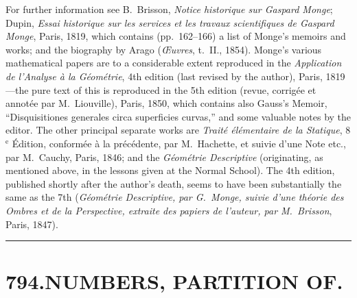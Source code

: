 \documentclass[11pt,a4paper]{article}
\begin{document}
For further information see B.\ Brisson, \textit{Notice historique sur Gaspard Monge}; Dupin, \textit{Essai historique sur les services et les travaux scientifiques de Gaspard Monge}, Paris, 1819, which contains (pp.~162--166) a list of Monge's memoirs and works; and the biography by Arago (\textit{\OE uvres}, t.~II., 1854). Monge's various mathematical papers are to a considerable extent reproduced in the \textit{Application de l'Analyse \`a la G\'eom\'etrie}, 4th edition (last revised by the author), Paris, 1819---the pure text of this is reproduced in the 5th edition (revue, corrig\'ee et annot\'ee par M.\ Liouville), Paris, 1850, which contains also Gauss's Memoir, ``Disquisitiones generales circa superficies curvas,'' and some valuable notes by the editor. The other principal separate works are \textit{Trait\'e \'el\'ementaire de la Statique}, 8$^{\text{e}}$ \'Edition, conform\'ee \`a la pr\'ec\'edente, par M.\ Hachette, et suivie d'une Note etc., par M.\ Cauchy, Paris, 1846; and the \textit{G\'eom\'etrie Descriptive} (originating, as mentioned above, in the lessons given at the Normal School). The 4th edition, published shortly after the author's death, seems to have been substantially the same as the 7th (\textit{G\'eom\'etrie Descriptive, par G.\ Monge, suivie d'une th\'eorie des Ombres et de la Perspective, extraite des papiers de l'auteur, par M.\ Brisson}, Paris, 1847).

\vspace{1em}
\hrule
\vspace{1em}



\section*{794.\quad NUMBERS, PARTITION OF.}


\smallskip
\end{document}
